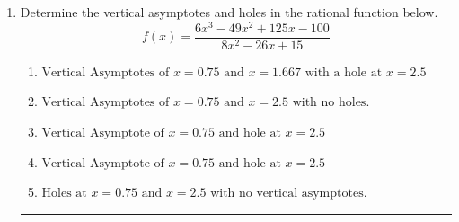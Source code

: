 \documentclass[14pt]{extbook}
\newcommand{\litem}[1]{\item#1\hspace*{-1cm}\rule{\textwidth}{0.4pt}}
\begin{document}
\begin{enumerate}
{\begin{enumerate}[label=\Alph*.]
\end{enumerate} }
\litem{
Determine the vertical asymptotes and holes in the rational function below.\[ f(x) = \frac{6x^{3} -49 x^{2} +125 x -100}{8x^{2} -26 x + 15} \]\begin{enumerate}[label=\Alph*.]
\item \( \text{Vertical Asymptotes of } x = 0.75 \text{ and } x = 1.667 \text{ with a hole at } x = 2.5 \)
\item \( \text{Vertical Asymptotes of } x = 0.75 \text{ and } x = 2.5 \text{ with no holes.} \)
\item \( \text{Vertical Asymptote of } x = 0.75 \text{ and hole at } x = 2.5 \)
\item \( \text{Vertical Asymptote of } x = 0.75 \text{ and hole at } x = 2.5 \)
\item \( \text{Holes at } x = 0.75 \text{ and } x = 2.5 \text{ with no vertical asymptotes.} \)

\end{enumerate} }
\end{enumerate}
\end{document}
